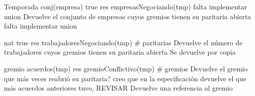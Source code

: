 \begin{interfaz}{Temporada}
{}{conj(empresa)}
{true}
{res \igobs empresasNegociando(tmp)}
{falta implementar union}
{Devuelve el conjunto de empresas cuyos gremios tienen su paritaria abierta}
{falta implementar union}

{}{nat}
{true}
{res \igobs trabajadoresNegociando(tmp)}
{\# paritarias}
{Devuelve el número de trabajadores cuyos gremios tienen su paritaria abierta}
{Se devuelve por copia}

{}{gremio}
{\emptyset \neq acuerdos(tmp)}
{res \igobs gremioConflictivo(tmp)}
{\# gremios}
{Devuelve el gremio que más veces reabrió su paritaria? creo que en la especificación devuelve el que más acuerdos anteriores tuvo, REVISAR }
{Devuelve una referencia al gremio}


\end{interfaz}